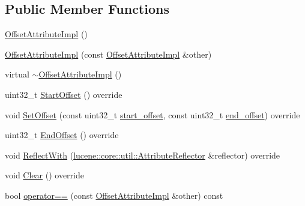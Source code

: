 \subsection*{Public Member Functions}
\begin{DoxyCompactItemize}
\item 
\mbox{\hyperlink{classlucene_1_1core_1_1analysis_1_1tokenattributes_1_1OffsetAttributeImpl_a424f18384e62360c38c1cd3e797dc80c}{Offset\+Attribute\+Impl}} ()
\item 
\mbox{\hyperlink{classlucene_1_1core_1_1analysis_1_1tokenattributes_1_1OffsetAttributeImpl_a1b302380db18cbe111ddc892b3b04841}{Offset\+Attribute\+Impl}} (const \mbox{\hyperlink{classlucene_1_1core_1_1analysis_1_1tokenattributes_1_1OffsetAttributeImpl}{Offset\+Attribute\+Impl}} \&other)
\item 
virtual \mbox{\hyperlink{classlucene_1_1core_1_1analysis_1_1tokenattributes_1_1OffsetAttributeImpl_a6de20d33c5e4aed543d2386ccb3cef69}{$\sim$\+Offset\+Attribute\+Impl}} ()
\item 
uint32\+\_\+t \mbox{\hyperlink{classlucene_1_1core_1_1analysis_1_1tokenattributes_1_1OffsetAttributeImpl_afe05dd1af07cc98ff4baceb531ae5f0a}{Start\+Offset}} () override
\item 
void \mbox{\hyperlink{classlucene_1_1core_1_1analysis_1_1tokenattributes_1_1OffsetAttributeImpl_ab554b85bf6d64ce023c0634b3883c803}{Set\+Offset}} (const uint32\+\_\+t \mbox{\hyperlink{classlucene_1_1core_1_1analysis_1_1tokenattributes_1_1OffsetAttributeImpl_a1e2b8c747f3f0216a9044b9fd61ea843}{start\+\_\+offset}}, const uint32\+\_\+t \mbox{\hyperlink{classlucene_1_1core_1_1analysis_1_1tokenattributes_1_1OffsetAttributeImpl_a2e25d7e34687e7d39baaaf88636238c7}{end\+\_\+offset}}) override
\item 
uint32\+\_\+t \mbox{\hyperlink{classlucene_1_1core_1_1analysis_1_1tokenattributes_1_1OffsetAttributeImpl_a1e70ec558f605ea2313e41ba5c64e379}{End\+Offset}} () override
\item 
void \mbox{\hyperlink{classlucene_1_1core_1_1analysis_1_1tokenattributes_1_1OffsetAttributeImpl_ad7eb3a266863f7e14fbe1caa315c7151}{Reflect\+With}} (\mbox{\hyperlink{namespacelucene_1_1core_1_1util_a7dbb701adaed055f73fb95eec83da10a}{lucene\+::core\+::util\+::\+Attribute\+Reflector}} \&reflector) override
\item 
void \mbox{\hyperlink{classlucene_1_1core_1_1analysis_1_1tokenattributes_1_1OffsetAttributeImpl_af19f560600cc53e48c592aa6d9c48a91}{Clear}} () override
\item 
bool \mbox{\hyperlink{classlucene_1_1core_1_1analysis_1_1tokenattributes_1_1OffsetAttributeImpl_a3a7da0e72e05757a8e2c540fc639cca8}{operator==}} (const \mbox{\hyperlink{classlucene_1_1core_1_1analysis_1_1tokenattributes_1_1OffsetAttributeImpl}{Offset\+Attribute\+Impl}} \&other) const

\end{DoxyCompactItemize}
